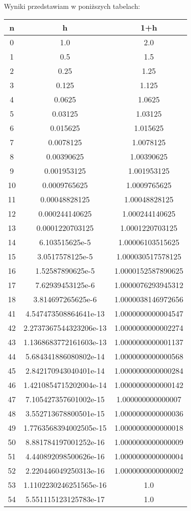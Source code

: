 \documentclass[12pt]{article}
\begin{document}
Wyniki przedstawiam w poniższych tabelach:
\begin{table}[]
	\centering
    \label{tab:table1}
    \begin{tabular}{|c|c|c|}
    		\hline
      	n & h & 1+h \\
      	\hline
		0 & 1.0 & 2.0\\
\hline
1 & 0.5 & 1.5\\
\hline
2 & 0.25 & 1.25\\
\hline
3 & 0.125 & 1.125\\
\hline
4 & 0.0625 & 1.0625\\
\hline
5 & 0.03125 & 1.03125\\
\hline
6 & 0.015625 & 1.015625\\
\hline
7 & 0.0078125 & 1.0078125\\
\hline
8 & 0.00390625 & 1.00390625\\
\hline
9 & 0.001953125 & 1.001953125\\
\hline
10 & 0.0009765625 & 1.0009765625\\
\hline
11 & 0.00048828125 & 1.00048828125\\
\hline
12 & 0.000244140625 & 1.000244140625\\
\hline
13 & 0.0001220703125 & 1.0001220703125\\
\hline
14 & 6.103515625e-5 & 1.00006103515625\\
\hline
15 & 3.0517578125e-5 & 1.000030517578125\\
\hline
16 & 1.52587890625e-5 & 1.0000152587890625\\
\hline
17 & 7.62939453125e-6 & 1.0000076293945312\\
\hline
18 & 3.814697265625e-6 & 1.0000038146972656\\
\hline
\hline
41 & 4.547473508864641e-13 & 1.0000000000004547\\
\hline
42 & 2.2737367544323206e-13 & 1.0000000000002274\\
\hline
43 & 1.1368683772161603e-13 & 1.0000000000001137\\
\hline
44 & 5.684341886080802e-14 & 1.0000000000000568\\
\hline
45 & 2.842170943040401e-14 & 1.0000000000000284\\
\hline
46 & 1.4210854715202004e-14 & 1.0000000000000142\\
\hline
47 & 7.105427357601002e-15 & 1.000000000000007\\
\hline
48 & 3.552713678800501e-15 & 1.0000000000000036\\
\hline
49 & 1.7763568394002505e-15 & 1.0000000000000018\\
\hline
50 & 8.881784197001252e-16 & 1.0000000000000009\\
\hline
51 & 4.440892098500626e-16 & 1.0000000000000004\\
\hline
52 & 2.220446049250313e-16 & 1.0000000000000002\\
\hline
53 & 1.1102230246251565e-16 & 1.0\\
\hline
54 & 5.551115123125783e-17 & 1.0\\
\hline
    \end{tabular}
\end{table}
\end{document}
